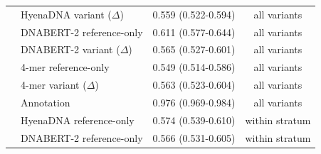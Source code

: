 \begin{tabular}{llcc}
\quad & HyenaDNA variant ($\Delta$) & 0.559 (0.522-0.594) & all variants\\
\quad & DNABERT-2 reference-only & 0.611 (0.577-0.644) & all variants\\
\quad & DNABERT-2 variant ($\Delta$) & 0.565 (0.527-0.601) & all variants\\
\quad & 4-mer reference-only & 0.549 (0.514-0.586) & all variants\\
\quad & 4-mer variant ($\Delta$) & 0.563 (0.523-0.604) & all variants\\
\quad & Annotation & 0.976 (0.969-0.984) & all variants\\
\quad & HyenaDNA reference-only & 0.574 (0.539-0.610) & within stratum\\
\quad & DNABERT-2 reference-only & 0.566 (0.531-0.605) & within stratum\\
\midrule
\bottomrule\end{tabular}
